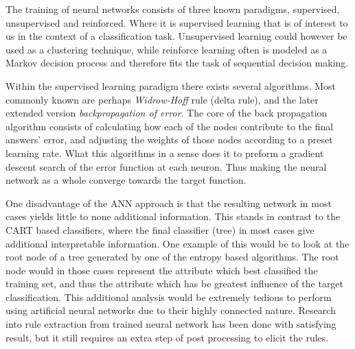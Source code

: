 	
	\bigskip\noindent
	The training of neural networks consists of three known paradigms, supervised, unsupervised and reinforced. 
	Where it is supervised learning that is of interest to us in the context of a classification task. 
	Unsupervised learning could however be used as a clustering technique, 
	while reinforce learning often is modeled as a Markov decision process and therefore fits the task of sequential decision making. \cite{bioAI}
	
	\bigskip\noindent
	Within the supervised learning paradigm there exists several algorithms. 
	Most commonly known are perhaps \textit{Widrow-Hoff} rule (delta rule)\cite{widrowhoff}, and the later extended version \textit{backpropagation of error}\cite{rumelhart1986learning}\cite{rumelhart1986parallel}. 
	The core of the back propagation algorithm consists of calculating how each of the nodes contribute to the final answers' error, 
	and adjusting the weights of those nodes according to a preset learning rate. 
	What this algorithms in a sense does it to preform a gradient descent search of the error function at each neuron.
	Thus making the neural network as a whole converge towards the target function. 
	
	\bigskip\noindent
	One disadvantage of the ANN approach is that the resulting network in most cases yields little to none additional information.
	This stands in contrast to the CART based classifiers, where the final classifier (tree) in most cases give additional interpretable information. 
	One example of this would be to look at the root node of a tree generated by one of the entropy based algorithms.
	The root node would in those cases represent the attribute which best classified the training set, 
	and thus the attribute which has be greatest influence of the target classification. 
	This additional analysis would be extremely tedious to perform using artificial neural networks due to their highly connected nature.
	Research into rule extraction from trained neural network has been done with satisfying result, 
	but it still requires an extra step of post processing to elicit the rules.~\cite{augastarule}
	
	
	
	
	
	